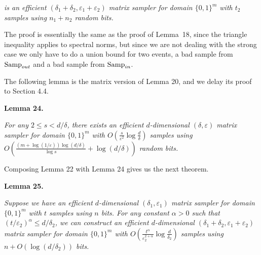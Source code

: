 \emph{is an efficient $(\delta_{1}+\delta_{2},\varepsilon_{1}+\varepsilon_{2})$ matrix sampler for domain $\{0,1\}^{m}$ with $t_{2}$ samples using $n_{1}+n_{2}$ random bits.}\par






The proof is essentially the same as the proof of Lemma 18, since the triangle inequality applies to spectral norms, but since we are not dealing with the strong case we only have to do a union bound for two events, a bad sample from $\textup{{Samp}}_{out}$ and a bad sample from $\textup{{Samp}}_{in}$.\par




The following lemma is the matrix version of Lemma 20, and we delay its proof to Section 4.4.\par





\par\medskip\noindent\textbf{
\textbf{Lemma 24}\textbf{.}
}\par



\emph{For any $2\leq s<d/\delta$, there exists an efficient $d$-dimensional $(\delta,\varepsilon)$ matrix sampler for domain $\{0,1\}^{m}$ with $O(\frac{s}{\varepsilon^{2}}\log\frac{d}{\delta})$ samples using
$O(\frac{(m+\log(1/\varepsilon))\log(d/\delta)}{\log s}+\log(d/\delta))$
random bits.}\par






Composing Lemma 22 with Lemma 24 gives us the next theorem.\par





\par\medskip\noindent\textbf{
\textbf{Lemma 25}\textbf{.}
}\par



\emph{Suppose we have an efficient $d$-dimensional $(\delta_{1},\varepsilon_{1})$ matrix sampler for domain $\{0,1\}^{m}$ with $t$ samples using $n$ bits. For any constant $\alpha>0$ such that $(t/\varepsilon_{2})^{\alpha}\leq d/\delta_{2}$, we can construct an efficient $d$-dimensional $(\delta_{1}+\delta_{2},\varepsilon_{1}+\varepsilon_{2})$ matrix sampler for domain $\{0,1\}^{m}$ with $O(\frac{t^{\alpha}}{\varepsilon_{2}^{2+\alpha}}\log\frac{d}{\delta_{2}})$ samples using $n+O(\log(d/\delta_{2}))$ bits.}\par



